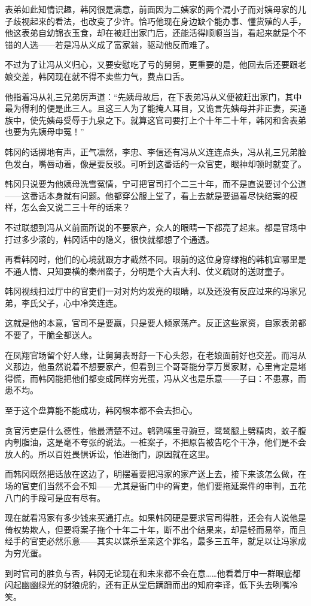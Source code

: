 表弟如此知情识趣，韩冈很是满意，前面因为二姨家的两个混小子而对姨母家的儿子歧视起来的看法，也改变了少许。恰巧他现在身边缺个能办事、懂货殖的人手，他这表弟自幼锦衣玉食，却在被赶出家门后，还能活得顺顺当当，看起来就是个不错的人选——若是冯从义成了富家翁，驱动他反而难了。

不过为了让冯从义归心，又要安慰吃了亏的舅舅，更重要的是，他回去后还要跟老娘交差，韩冈现在就不得不卖些力气，费点口舌。

他指着冯从礼三兄弟厉声道：“先姨母故后，在下表弟冯从义便被赶出家门，其中最为得利的便是此三人。且这三人为了能掩人耳目，又诡言先姨母并非正妻，买通族中，使先姨母受辱于九泉之下。就算这官司要打上个十年二十年，韩冈和舍表弟也要为先姨母申冤！”

韩冈的话掷地有声，正气凛然，李忠、李信还有冯从义连连点头，冯从礼三兄弟脸色发白，嘴唇动着，像是要反驳。可听到这番话的一众官吏，眼神却顿时就变了。

韩冈只说要为他姨母洗雪冤情，宁可把官司打个二三十年，而不是直说要讨个公道——这番话本身就有问题。他都穿公服上堂了，看上去就是要逼着尽快结案的模样，怎么会又说二三十年的话来？

不过联想到冯从义前面所说的不要家产，众人的眼睛一下都亮了起来。都是官场中打过多少滚的，韩冈话中的隐义，很快就都想了个通透。

再看韩冈时，他们的心境就跟方才截然不同。眼前的这位身穿绿袍的韩机宜哪里是不通人情、只知耍横的秦州蛮子，分明是个大吉大利、仗义疏财的送财童子。

韩冈视线扫过厅中的官吏们一对对灼灼发亮的眼睛，以及还没有反应过来的冯家兄弟，李氏父子，心中冷笑连连。

这就是他的本意，官司不是要赢，只是要人倾家荡产。反正这些家资，自家表弟都不要了，干脆全都送人。

在凤翔官场留个好人缘，让舅舅表哥舒一下心头怨，在老娘面前好也交差。而冯从义那边，他虽然说着不想要家产，但看到三个哥哥能分享万贯家财，心里肯定是堵得慌，而韩冈能把他们都变成同样穷光蛋，冯从义也是乐意——子曰：不患寡，而患不均。

至于这个盘算能不能成功，韩冈根本都不会去担心。

贪官污吏是什么德性，他最清楚不过。鹌鹑嗉里寻豌豆，鹭鸶腿上劈精肉，蚊子腹内刳脂油，这是毫不夸张的说法。一桩案子，不把原告被告吃个干净，他们是不会放人的。所以百姓畏惧诉讼，怕进衙门，原因就在这里。

而韩冈既然把话放在这边了，明摆着要把冯家的家产送上去，接下来该怎么做，在场的官吏们当然不会不知——尤其是衙门中的胥吏，他们要拖延案件的审判，五花八门的手段可是应有尽有。

现在就看冯家有多少钱来买通打点。如果韩冈硬是要求官司得胜，还会有人说他是倚权势欺人，但要将案子拖个十年二十年，断不出个结果来，却是轻而易举，而且经手的官吏必然乐意——其实以谋杀至亲这个罪名，最多三五年，就足以让冯家成为穷光蛋。

到时官司的胜负与否，韩冈无论现在和未来都不会在意……他看着厅中一群眼底都闪起幽幽绿光的豺狼虎豹，还有正从堂后蹒跚而出的知府李译，低下头去咧嘴冷笑。


